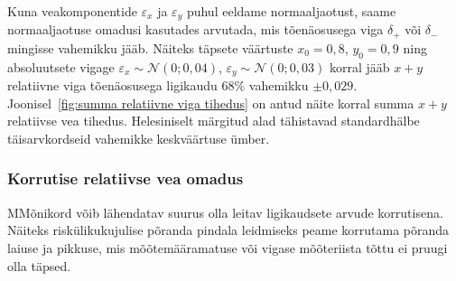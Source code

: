 Kuna veakomponentide $\varepsilon_x$ ja $\varepsilon_y$ puhul eeldame normaaljaotust, saame normaaljaotuse omadusi kasutades arvutada, mis tõenäosusega viga $\delta_{+}$ või $\delta_{-}$ mingisse vahemikku jääb. Näiteks täpsete väärtuste $x_0 = 0{,}8$, $y_0 = 0{,}9$ ning absoluutsete vigage $\varepsilon_x \sim \mathcal{N}(0; 0{,}04)$, $\varepsilon_y \sim \mathcal{N}(0; 0{,}03)$ korral jääb $x + y$ relatiivne viga tõenäosusega ligikaudu $68\%$ vahemikku $\pm 0{,}029$. Joonisel~\ref{fig:summa relatiivne viga tihedus} on antud näite korral summa $x + y$ relatiivse vea tihedus. Helesiniselt märgitud alad tähistavad standardhälbe täisarvkordseid vahemikke keskväärtuse ümber.

\subsubsection{Korrutise relatiivse vea omadus}
MMõnikord võib lähendatav suurus olla leitav ligikaudsete arvude korrutisena. Näiteks riskülikukujulise põranda pindala leidmiseks peame korrutama põranda laiuse ja pikkuse, mis mõõtemääramatuse või vigase mõõteriista tõttu ei pruugi olla täpsed.

